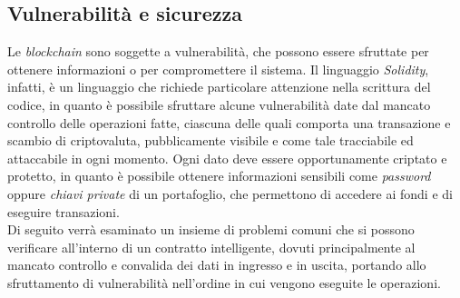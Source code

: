 \clearpage

\subsection{Vulnerabilità e sicurezza}\label{sec:tecnologie-blockchain-avanzate-vulnerabilita-sicurezza}

Le \textit{blockchain} sono soggette a vulnerabilità, che possono essere sfruttate per ottenere informazioni o per compromettere il sistema.
Il linguaggio \textit{Solidity}, infatti, è un linguaggio che richiede particolare attenzione nella scrittura del codice, in quanto è possibile sfruttare alcune vulnerabilità date dal mancato controllo delle operazioni fatte, ciascuna
delle quali comporta una transazione e scambio di criptovaluta, pubblicamente visibile e come tale tracciabile ed attaccabile in ogni momento. 
Ogni dato deve essere opportunamente criptato e protetto, in quanto è possibile ottenere informazioni sensibili come \textit{password} oppure \textit{chiavi private} di un portafoglio, che permettono di accedere ai fondi
e di eseguire transazioni. \\
Di seguito verrà esaminato un insieme di problemi comuni che si possono verificare all'interno di un contratto intelligente, dovuti principalmente al mancato controllo e convalida 
dei dati in ingresso e in uscita, portando allo sfruttamento di vulnerabilità nell'ordine in cui vengono eseguite le operazioni.

